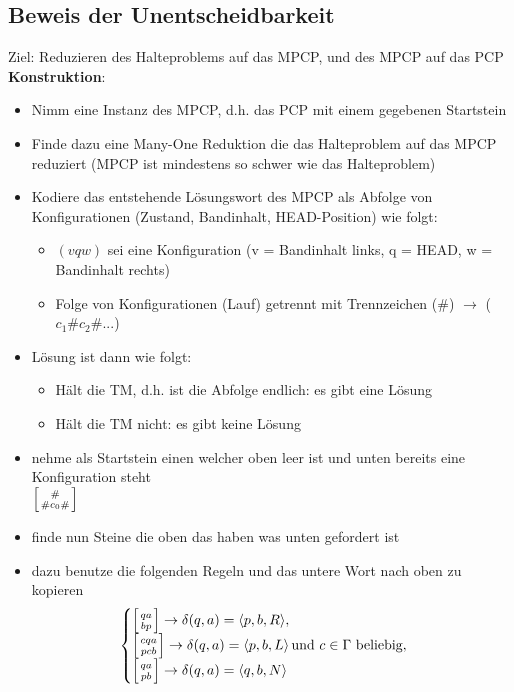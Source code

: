 \documentclass[12pt,a4paper]{article}
\begin{document}
\subsection{Beweis der Unentscheidbarkeit}
Ziel: Reduzieren des Halteproblems auf das MPCP, und des MPCP auf das PCP\\
\textbf{Konstruktion}:\\
\begin{itemize}
\item Nimm eine Instanz des MPCP, d.h. das PCP mit einem gegebenen Startstein
\item Finde dazu eine Many-One Reduktion die das Halteproblem auf das MPCP reduziert (MPCP ist mindestens so schwer wie das Halteproblem)
\item Kodiere das entstehende Lösungswort des MPCP als Abfolge von Konfigurationen (Zustand, Bandinhalt, HEAD-Position) wie folgt:
\begin{itemize}
\item $(vqw)$ sei eine Konfiguration (v = Bandinhalt links, q = HEAD, w = Bandinhalt rechts)
\item Folge von Konfigurationen (Lauf) getrennt mit Trennzeichen ($\#$) $\rightarrow$ ($c_1 \# c_2  \# ...$)
\end{itemize}
\item Lösung ist dann wie folgt:
\begin{itemize}
\item Hält die TM, d.h. ist die Abfolge endlich: es gibt eine Lösung
\item Hält die TM nicht: es gibt keine Lösung
\end{itemize}
\item nehme als Startstein einen welcher oben leer ist und unten bereits eine Konfiguration steht\\
$ \left[ {\# \atop \# c_0 \#} \right]$
\item finde nun Steine die oben das haben was unten gefordert ist
\item dazu benutze die folgenden Regeln und das untere Wort nach oben zu kopieren$$
\begin{cases}
\left[ {qa \atop bp} \right] \rightarrow \delta(q,a) = \langle p,b,R \rangle,\\
\left[ {cqa \atop pcb} \right] \rightarrow \delta(q,a) = \langle p,b,L \rangle \, \text{und $c \in \Gamma$ beliebig},\\
\left[ {qa \atop pb} \right] \rightarrow \delta(q,a) = \langle q,b,N \rangle\\
\end{cases}
$$
\end{itemize}
\end{document}
